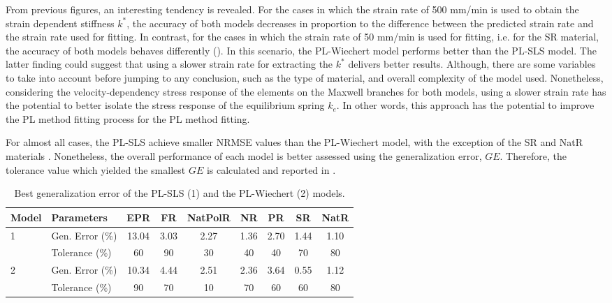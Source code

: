 From previous figures, an interesting tendency is revealed. For the cases in which the strain rate of 500 mm/min is used to obtain the strain dependent stiffness $k^*$, the accuracy of both models decreases in proportion to the difference between the predicted strain rate and the strain rate used for fitting. In contrast, for the cases in which the strain rate of 50 mm/min is used for fitting, i.e. for the SR material, the accuracy of both models behaves differently (). In this scenario, the PL-Wiechert model performs better than the PL-SLS model. The latter finding could suggest that using a slower strain rate for extracting the $k^*$ delivers better results. Although, there are some variables to take into account before jumping to any conclusion, such as the type of material, and overall complexity of the model used. Nonetheless, considering the velocity-dependency stress response of the elements on the Maxwell branches for both models, using a slower strain rate has the potential to better isolate the stress response of the equilibrium spring $k_e$. In other words, this approach has the potential to improve the PL method fitting process for the PL method fitting.

For almost all cases, the PL-SLS achieve smaller NRMSE values than the PL-Wiechert model, with the exception of the SR and NatR materials . Nonetheless, the overall performance of each model is better assessed using the generalization error, $GE$. Therefore, the tolerance value which yielded the smallest $GE$ is calculated and reported in .

\begin{table*}[htbp!]
	\centering
	\caption{Best generalization error of the PL-SLS (1) and the PL-Wiechert (2) models.}
	\label{tbl:GenError}
	\begin{tabular}{llccccccc} \toprule
		Model 					& Parameters 		& EPR	& FR 	& NatPolR & NR & PR & SR & NatR \\
		\hline
		\multirow{2}{*}{1}  & Gen. Error (\%)		& 13.04	& 3.03 	& 2.27 	& 1.36 & 2.70 & 1.44 & 1.10 \\
		& Tolerance (\%)							& 60	& 90 	& 30 	& 40 	& 40 & 70 & 80 \\
		\hline 
		\multirow{2}{*}{2}  & Gen. Error (\%)		& 10.34	& 4.44 	& 2.51 	& 2.36 & 3.64 & 0.55 & 1.12\\		
		& Tolerance	(\%)							& 90	& 70 	& 10 	& 70 	& 60 & 60 & 80 \\		
		\bottomrule
	\end{tabular}
\end{table*}

